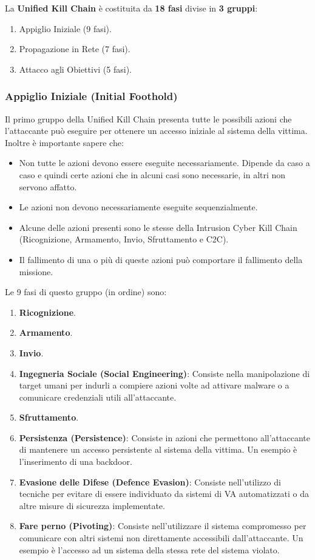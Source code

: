 \documentclass{article}
\begin{document}
La \textbf{Unified Kill Chain} è costituita da \textbf{18 fasi} divise in \textbf{3 gruppi}:
\begin{enumerate}
    \item Appiglio Iniziale (9 fasi).
    \item Propagazione in Rete (7 fasi).
    \item Attacco agli Obiettivi (5 fasi).
\end{enumerate}

\subsubsection{Appiglio Iniziale (Initial Foothold)}
Il primo gruppo della Unified Kill Chain presenta tutte le possibili azioni che l'attaccante può eseguire per ottenere un accesso iniziale al sistema della vittima. Inoltre è importante sapere che:
\begin{itemize}
    \item Non tutte le azioni devono essere eseguite necessariamente. Dipende da caso a caso e quindi certe azioni che in alcuni casi sono necessarie, in altri non servono affatto.
    \item Le azioni non devono necessariamente eseguite sequenzialmente.
    \item Alcune delle azioni presenti sono le stesse della Intrusion Cyber Kill Chain (Ricognizione, Armamento, Invio, Sfruttamento e C2C).
    \item Il fallimento di una o più di queste azioni può comportare il fallimento della missione.
\end{itemize}

Le 9 fasi di questo gruppo (in ordine) sono:
\begin{enumerate}
    \item \textbf{Ricognizione}.
    \item \textbf{Armamento}.
    \item \textbf{Invio}.
    \item \textbf{Ingegneria Sociale (Social Engineering)}: Consiste nella manipolazione di target umani per indurli a compiere azioni volte ad attivare malware o a comunicare credenziali utili all'attaccante.
    \item \textbf{Sfruttamento}.
    \item \textbf{Persistenza (Persistence)}: Consiste in azioni che permettono all'attaccante di mantenere un accesso persistente al sistema della vittima. Un esempio è l'inserimento di una backdoor.
    \item \textbf{Evasione delle Difese (Defence Evasion)}: Consiste nell'utilizzo di tecniche per evitare di essere individuato da sistemi di VA automatizzati o da altre misure di sicurezza implementate. 
    \item \textbf{Fare perno (Pivoting)}: Consiste nell'utilizzare il sistema compromesso per comunicare con altri sistemi non direttamente accessibili dall'attaccante. Un esempio è l'accesso ad un sistema della stessa rete del sistema violato.
\end{enumerate}
\end{document}
